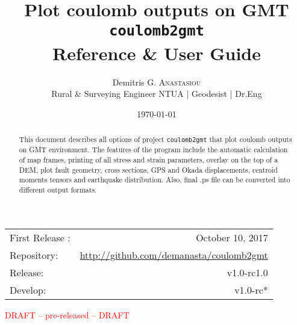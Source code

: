 \documentclass{article}
\title{\vskip 3cm Plot coulomb outputs on GMT \texttt{coulomb2gmt} \\ \large{Reference \& User Guide} } %
\author{Demitris G. \textsc{Anastasiou} \\ \normalsize{Rural \& Surveying Engineer NTUA | Geodesist | Dr.Eng} } %
\date{\today} %
\begin{document}
\maketitle %
\begin{center}
\vskip 1cm
\begin{tabular}{l r}
First Release : & October 10, 2017 \\
Repository:    & \url{http://github.com/demanasta/coulomb2gmt} \\
Release:        & v1.0-rc1.0\\
Develop:        & v1.0-rc*\\
\end{tabular}
\end{center}
\vfill
\begin{center}
\textcolor{red}{\huge DRAFT -- pre-released -- DRAFT}
\end{center}
\vfill
\begin{abstract}
{\small 
This document describes all options of project \texttt{coulomb2gmt} that plot 
coulomb outputs on GMT environment. The features of the program include the 
automatic calculation of map frames, printing of all stress and strain parameters,
overlay on the top of a DEM, plot fault geometry, cross sections, GPS and Okada 
displacements, centroid moments tensors and earthquake distribution. Also, final 
.ps file can be converted into different output formats.
}
\end{abstract}
\clearpage

\tableofcontents
\clearpage


\end{document}
